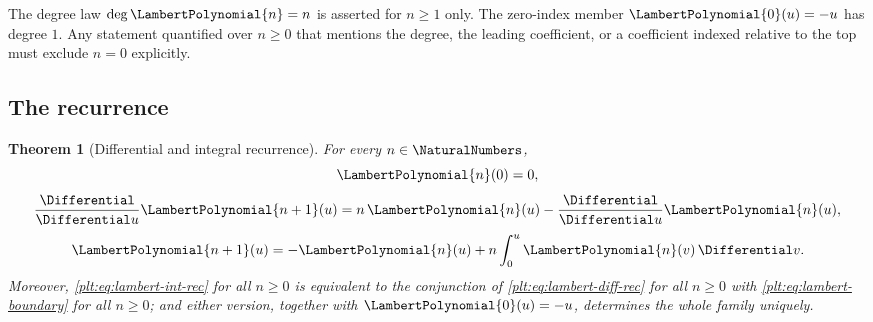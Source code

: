 \documentclass[11pt,oneside]{article}
\theoremstyle{plain}
\newtheorem{theorem}{Theorem}[section]
\theoremstyle{definition}
\theoremstyle{remark}
\newcommand{\LamP}[1]{\LambertPolynomial{#1}}
\begin{document}
\begin{warningbox}
The degree law \(\deg\LamP{n}=n\) is asserted for \(n\ge1\) only.  The
zero-index member \(\LamP{0}(u)=-u\) has degree \(1\).  Any statement
quantified over \(n\ge0\) that mentions the degree, the leading coefficient,
or a coefficient indexed relative to the top must exclude \(n=0\) explicitly.
\end{warningbox}

\subsection{The recurrence}

\begin{theorem}[Differential and integral recurrence]
\label{plt:thm:lambert-recurrence}
For every \(n\in\NaturalNumbers\),
\begin{equation}\label{plt:eq:lambert-boundary}
 \LamP{n}(0)=0,
\end{equation}
\begin{equation}\label{plt:eq:lambert-diff-rec}
 \frac{\Differential}{\Differential u}\LamP{n+1}(u)
 =n\,\LamP{n}(u)-\frac{\Differential}{\Differential u}\LamP{n}(u),
\end{equation}
\begin{equation}\label{plt:eq:lambert-int-rec}
 \LamP{n+1}(u)=-\LamP{n}(u)+n\int_{0}^{u}\LamP{n}(v)\,\Differential v .
\end{equation}
Moreover, \eqref{plt:eq:lambert-int-rec} for all \(n\ge0\) is equivalent to
the conjunction of \eqref{plt:eq:lambert-diff-rec} for all \(n\ge0\) with
\eqref{plt:eq:lambert-boundary} for all \(n\ge0\); and either version,
together with \(\LamP{0}(u)=-u\), determines the whole family uniquely.
\end{theorem}
\end{document}
